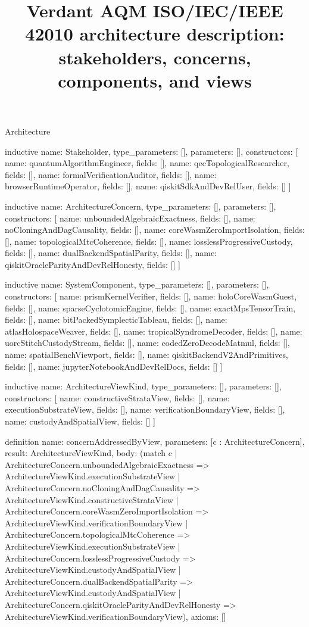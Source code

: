 \begin{lexlean}{Architecture}
\title{Verdant AQM ISO/IEC/IEEE 42010 architecture description: stakeholders, concerns, components, and views}

\begin{semanticmodule}

inductive{
  name: Stakeholder,
  type_parameters: [],
  parameters: [],
  constructors: [
    {name: quantumAlgorithmEngineer, fields: []},
    {name: qecTopologicalResearcher, fields: []},
    {name: formalVerificationAuditor, fields: []},
    {name: browserRuntimeOperator, fields: []},
    {name: qiskitSdkAndDevRelUser, fields: []}
  ]
}

inductive{
  name: ArchitectureConcern,
  type_parameters: [],
  parameters: [],
  constructors: [
    {name: unboundedAlgebraicExactness, fields: []},
    {name: noCloningAndDagCausality, fields: []},
    {name: coreWasmZeroImportIsolation, fields: []},
    {name: topologicalMtcCoherence, fields: []},
    {name: losslessProgressiveCustody, fields: []},
    {name: dualBackendSpatialParity, fields: []},
    {name: qiskitOracleParityAndDevRelHonesty, fields: []}
  ]
}

inductive{
  name: SystemComponent,
  type_parameters: [],
  parameters: [],
  constructors: [
    {name: prismKernelVerifier, fields: []},
    {name: holoCoreWasmGuest, fields: []},
    {name: sparseCyclotomicEngine, fields: []},
    {name: exactMpsTensorTrain, fields: []},
    {name: bitPackedSymplecticTableau, fields: []},
    {name: atlasHolospaceWeaver, fields: []},
    {name: tropicalSyndromeDecoder, fields: []},
    {name: uorcStitchCustodyStream, fields: []},
    {name: codedZeroDecodeMatmul, fields: []},
    {name: spatialBenchViewport, fields: []},
    {name: qiskitBackendV2AndPrimitives, fields: []},
    {name: jupyterNotebookAndDevRelDocs, fields: []}
  ]
}

inductive{
  name: ArchitectureViewKind,
  type_parameters: [],
  parameters: [],
  constructors: [
    {name: constructiveStrataView, fields: []},
    {name: executionSubstrateView, fields: []},
    {name: verificationBoundaryView, fields: []},
    {name: custodyAndSpatialView, fields: []}
  ]
}

definition{
  name: concernAddressedByView,
  parameters: [c : ArchitectureConcern],
  result: ArchitectureViewKind,
  body: (match c
    | ArchitectureConcern.unboundedAlgebraicExactness => ArchitectureViewKind.executionSubstrateView
    | ArchitectureConcern.noCloningAndDagCausality => ArchitectureViewKind.constructiveStrataView
    | ArchitectureConcern.coreWasmZeroImportIsolation => ArchitectureViewKind.verificationBoundaryView
    | ArchitectureConcern.topologicalMtcCoherence => ArchitectureViewKind.executionSubstrateView
    | ArchitectureConcern.losslessProgressiveCustody => ArchitectureViewKind.custodyAndSpatialView
    | ArchitectureConcern.dualBackendSpatialParity => ArchitectureViewKind.custodyAndSpatialView
    | ArchitectureConcern.qiskitOracleParityAndDevRelHonesty => ArchitectureViewKind.verificationBoundaryView),
  axioms: []
}


\end{semanticmodule}
\end{lexlean}
